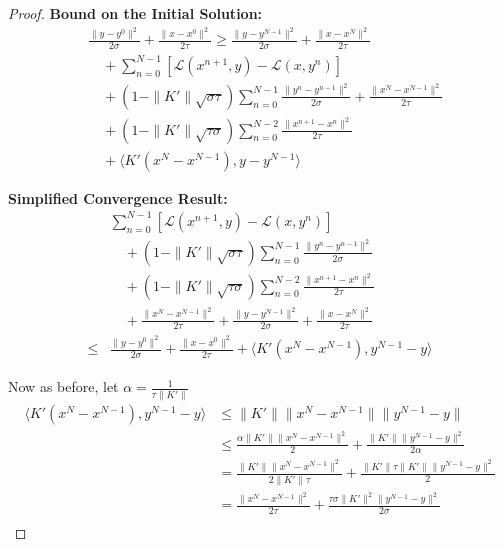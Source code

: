 \documentclass[10pt,a4paper]{amsart}
\begin{document}
\begin{proof}
\noindent\textbf{Bound on the Initial Solution:}
\begin{align*}
&\frac{\|y - y^{0}\|^2}{2\sigma} + \frac{\|x - x^0\|^2}{2\tau} \ge \frac{\|y - y^{N-1}\|^2}{2\sigma} + \frac{\|x - x^N\|^2}{2\tau} \\
&\quad + \sum_{n=0}^{N-1} \left[ \mathcal{L}(x^{n+1},y)- \mathcal{L}(x,y^n) \right] \\
&\quad + (1 - \|K'\|\sqrt{\sigma\tau}) \sum_{n=0}^{N-1} \frac{\|y^n - y^{n-1}\|^2}{2\sigma} + \frac{\|x^N - x^{N-1}\|^2}{2\tau} \\
&\quad + (1 - \|K'\|\sqrt{\tau\sigma}) \sum_{n=0}^{N-2} \frac{\|x^{n+1} - x^n\|^2}{2\tau} \\
&\quad + \langle K'(x^N - x^{N-1}), y - y^{N-1} \rangle
\end{align*}

\noindent\textbf{Simplified Convergence Result:}
\begin{align*}
&\sum_{n=0}^{N-1} \left[ \mathcal{L}(x^{n+1},y)- \mathcal{L}(x,y^n) \right] \\
&\quad + (1 - \|K'\|\sqrt{\sigma\tau}) \sum_{n=0}^{N-1} \frac{\|y^n - y^{n-1}\|^2}{2\sigma} \\
&\quad + (1 - \|K'\|\sqrt{\tau\sigma}) \sum_{n=0}^{N-2} \frac{\|x^{n+1} - x^n\|^2}{2\tau} \\
&\quad + \frac{\|x^N - x^{N-1}\|^2}{2\tau} + \frac{\|y - y^{N-1}\|^2}{2\sigma} + \frac{\|x - x^N\|^2}{2\tau}\\
\leq{}& \frac{\|y - y^{0}\|^2}{2\sigma} + \frac{\|x - x^0\|^2}{2\tau} + \langle K'(x^N - x^{N-1}), y^{N-1} - y \rangle
\end{align*}

Now as before, let \(\alpha=\frac{1}{\tau\|K'\|}\)
\[
    \begin{aligned}
    \langle K'(x^N - x^{N-1}), y^{N-1} - y \rangle &\le \|K'\|\|x^N - x^{N-1}\|\|y^{N-1} - y\|\\
    &\le \frac{\alpha\|K'\|\|x^N - x^{N-1}\|^2}{2} +\frac{\|K'\|\|y^{N-1} - y\|^2}{2\alpha}\\
    &= \frac{\|K'\|\|x^N - x^{N-1}\|^2}{2\|K'\|\tau} +\frac{\|K'\|\tau\|K'\|\|y^{N-1} - y\|^2}{2}\\
    &= \frac{\|x^N - x^{N-1}\|^2}{2\tau} +\frac{\tau\sigma\|K'\|^2\|y^{N-1} - y\|^2}{2\sigma}\\
\end{aligned}
\]


\end{proof}
\end{document}
